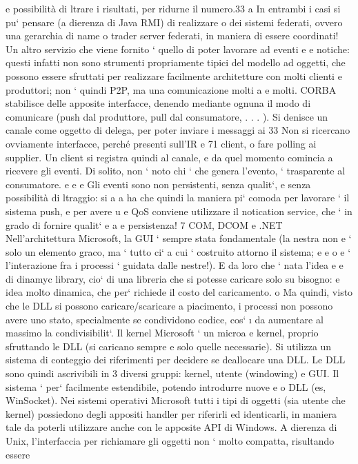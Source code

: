 \documentclass[a4paper,12pt]{article}
\begin{document}
e
possibilità di ltrare i risultati, per ridurne il numero.33
a
In entrambi i casi si pu` pensare (a dierenza di Java RMI) di realizzare
o
dei sistemi federati, ovvero una gerarchia di name o trader server federati, in
maniera di essere coordinati!
Un altro servizio che viene fornito ` quello di poter lavorare ad eventi e
e
notiche: questi infatti non sono strumenti propriamente tipici del modello ad
oggetti, che possono essere sfruttati per realizzare facilmente architetture con
molti clienti e produttori; non ` quindi P2P, ma una comunicazione molti a
e
molti.
CORBA stabilisce delle apposite interfacce, denendo mediante ognuna il
modo di comunicare (push dal produttore, pull dal consumatore, . . . ). Si
denisce un canale come oggetto di delega, per poter inviare i messaggi ai
33 Non
si ricercano ovviamente interfacce, perché presenti sull'IR
e
71
client, o fare polling ai supplier. Un client si registra quindi al canale, e da
quel momento comincia a ricevere gli eventi.
Di solito, non ` noto chi ` che genera l'evento, ` trasparente al consumatore.
e
e
e
Gli eventi sono non persistenti, senza qualit`, e senza possibilità di ltraggio: si
a
a
ha che quindi la maniera pi` comoda per lavorare ` il sistema push, e per avere
u
e
QoS conviene utilizzare il notication service, che ` in grado di fornire qualit`
e
a
e persistenza!
7
COM, DCOM e .NET
Nell'architettura Microsoft, la GUI ` sempre stata fondamentale (la nestra non
e
` solo un elemento graco, ma ` tutto ci` a cui ` costruito attorno il sistema;
e
e
o
e
`
l'interazione fra i processi ` guidata dalle nestre!). E da loro che ` nata l'idea
e
e
di dinamyc library, cio` di una libreria che si potesse caricare solo su bisogno:
e
idea molto dinamica, che per` richiede il costo del caricamento.
o
Ma quindi, visto che le DLL si possono caricare/scaricare a piacimento, i
processi non possono avere uno stato, specialmente se condividono codice, cos`
\i{}
da aumentare al massimo la condivisibilit`. Il kernel Microsoft ` un microa
e
kernel, proprio sfruttando le DLL (si caricano sempre e solo quelle necessarie).
Si utilizza un sistema di conteggio dei riferimenti per decidere se deallocare una
DLL.
Le DLL sono quindi ascrivibili in 3 diversi gruppi: kernel, utente (windowing) e GUI. Il sistema ` per` facilmente
estendibile, potendo introdurre nuove
e
o
DLL (es, WinSocket).
Nei sistemi operativi Microsoft tutti i tipi di oggetti (sia utente che kernel)
possiedono degli appositi handler per riferirli ed identicarli, in maniera tale da
poterli utilizzare anche con le apposite API di Windows. A dierenza di Unix,
l'interfaccia per richiamare gli oggetti non ` molto compatta, risultando essere
\end{document}
